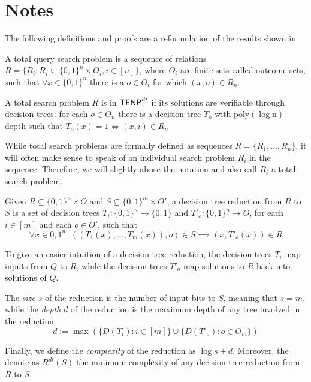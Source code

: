 \hypersetup{colorlinks=true, linkcolor=blue, citecolor=red}

\chapter{Notes} \label{chap:introduction}

The following definitions and proofs are a reformulation of the results shown in \cite{tfnp_characterization,separations_proof_complexity}

\begin{definition}
    A total query search problem is a sequence of relations $R = \{R_i : R_i \subseteq \{0,1\}^n \times O_i, i \in [n]\}$, where $O_i$ are finite sets called outcome sets, such that $\forall x \in \{0,1\}^n$ there is a $o \in O_i$ for which $(x,o) \in R_n$.

    A total search problem $R$ is in $\mathsf{TFNP}^{dt}$ if its solutions are verifiable through decision trees: for each $o \in O_n$ there is a decision tree $T_o$ with $\mathrm{poly(\log n)}$-depth such that $T_o(x) = 1 \iff (x,i) \in R_n$
\end{definition}

While total search problems are formally defined as sequences $R = \{R_1, \ldots, R_n\}$, it will often make sense to speak of an individual search problem $R_i$ in the sequence. Therefore, we will slightly abuse the notation and also call $R_i$ a total search problem.

\begin{definition}
    Given $R \subseteq \{0,1\}^n \times O$ and $S \subseteq \{0,1\}^m \times O'$, a decision tree reduction from $R$ to $S$ is a set of decision trees $T_i : \{0,1\}^n \to \{0,1\}$ and $T'_o : \{0,1\}^n \to O$, for each $i \in [m]$ and each $o \in O'$, such that
    \[\forall x \in {0,1}^n \;\; ((T_1(x), \ldots, T_m(x)), o) \in S \implies (x, T'_o(x)) \in R\]
\end{definition}

To give an easier intuition of a decision tree reduction, the decision trees $T_i$ map inputs from $Q$ to $R$, while the decision trees $T'_o$ map solutions to $R$ back into solutions of $Q$.

The \textit{size} $s$ of the reduction is the number of input bits to $S$, meaning that $s = m$, while the \textit{depth} $d$ of the reduction is the maximum depth of any tree involved in the reduction
\[d := \max(\{D(T_i) : i \in [m]\} \cup \{D(T'_o) : o \in O_m\})\]

Finally, we define the \textit{complexity} of the reduction as $\log s + d$. Moreover, the denote as $R^{dt}(S)$ the minimum complexity of any decision tree reduction from $R$ to $S$.

